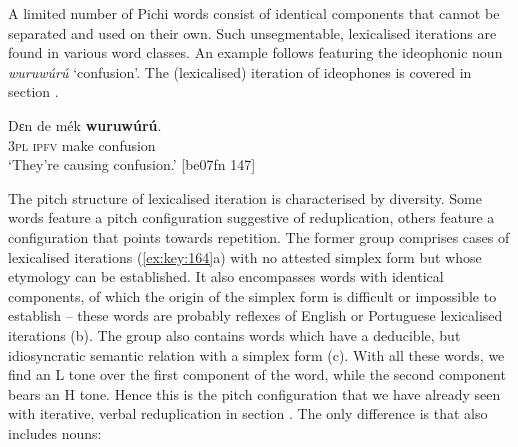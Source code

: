 A limited number of Pichi words consist of identical components that cannot be separated and used on their own. Such unsegmentable, lexicalised iterations are found in various word classes. An example follows featuring the ideophonic noun \textit{wuruwúrú} ‘confusion’. The (lexicalised) iteration of ideophones is covered in section . 


\ea%
    \label{ex:key:163}
    \gll Dɛn  de  mék    \textbf{wuruwúrú}.\\
\textsc{3pl}  \textsc{ipfv}  make  confusion\\

\glt ‘They’re causing confusion.’ [be07fn 147]
\z

The pitch structure of lexicalised iteration is characterised by diversity. Some words feature a pitch configuration suggestive of reduplication, others feature a configuration that points towards repetition. The former group comprises cases of lexicalised iterations (\ref{ex:key:164}a) with no attested simplex form but whose etymology can be established. It also encompasses words with identical components, of which the origin of the simplex form is difficult or impossible to establish – these words are probably reflexes of English or Portuguese lexicalised iterations (b). The group also contains words which have a deducible, but idiosyncratic semantic relation with a simplex form (c). With all these words, we find an L tone over the first component of the word, while the second component bears an H tone. Hence this is the pitch configuration that we have already seen with iterative, verbal reduplication in section . The only difference is that  also includes nouns:

